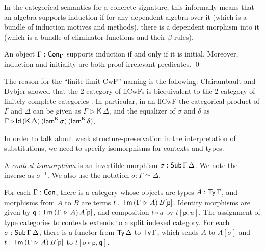 \documentclass[sigplan,review,anonymous]{acmart}\settopmatter{printfolios=true,printccs=false,printacmref=false}
\newcommand{\ext}{\triangleright}
\newcommand{\Kfam}{\mathsf{K}}
\newcommand{\p}{\mathsf{p}}
\newcommand{\q}{\mathsf{q}}
\newcommand{\lamK}{\mathsf{lam}^{\K}}
\newcommand{\bGamma}{\boldsymbol{\Gamma}}
\begin{document}
In the categorical semantics for a concrete signature, this informally means
that an algebra supports induction if for any dependent algebra over it (which
is a bundle of induction motives and methods), there is a dependent morphism
into it (which is a bundle of eliminator functions and their $\beta$-rules).

\begin{theorem}\label{thm:initialind}
An object $\Gamma : \Con_{\bGamma}$ supports induction if and only if it is
initial. Moreover, induction and initiality are both proof-irrelevant
predicates. \qed
\end{theorem}

The reason for the ``finite limit CwF'' naming is the following: Clairambault
and Dybjer showed that the 2-category of flCwFs is biequivalent to the
2-category of finitely complete categories
\cite{clairambault2014biequivalence}. In particular, in an flCwF the categorical
product of $\Gamma$ and $\Delta$ can be given as $\Gamma \ext \Kfam\, \Delta$,
and the equalizer of $\sigma$ and $\delta$ as $\Gamma\ext
\Id\,(\K\,\Delta)\,(\lamK\,\sigma)\,(\lamK\,\delta)$.

In order to talk about weak structure-preservation in the interpretation of substitutions, we need to specify isomorphisms for contexts and types.

\begin{definition} A \emph{context isomorphism} is an invertible morphism $\sigma : \mathsf{Sub}\,\Gamma\,\Delta$. We note the inverse as $\sigma^{-1}$. We also use the notation $\sigma : \Gamma \simeq \Delta$.
\end{definition}

\begin{definition}\label{def:type_categories} For each $\Gamma : \mathsf{Con}$, there is a category
whose objects are types $A : \mathsf{Ty}\,\Gamma$, and morphisms from $A$ to $B$ are
terms $t : \Tm\,(\Gamma\,\ext\,A)\,B[\p]$. Identity morphisms are given by $\q :
\Tm\,(\Gamma\,\ext\,A)\,A[\p]$, and composition $t \circ u$ by $t[\p, u]$. The
assignment of type categories to contexts extends to a split indexed category. For
each $\sigma : \mathsf{Sub}\,\Gamma\,\Delta$, there is a functor from $\mathsf{Ty}\,\Delta$ to
$\mathsf{Ty}\,\Gamma$, which sends $A$ to $A[\sigma]$ and $t :
\Tm\,(\Gamma\,\ext\,A)\,B[\p]$ to $t[\sigma\circ \p, \q]$.
\end{definition}
\end{document}
